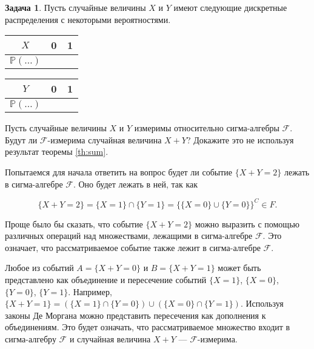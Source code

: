 \documentclass[pdftex, 12pt, a4paper]{article}
\def \mbb{\mathbb}
\def \PP{\mbb{P}}
\def\F{\ensuremath{\mathcal{F}}} %
\theoremstyle{definition} %
\newtheorem{problem}{Задача}
\numberwithin{problem}{section}
\numberwithin{blits}{section}
\begin{document}
\begin{problem}
Пусть случайные величины $X$ и $Y$ имеют следующие дискретные распределения с некоторыми вероятностями.

\begin{table}[H]
\centering
\setlength\tabcolsep{4pt}
\begin{minipage}{0.48\textwidth}
\centering
\begin{tabular}{|c|c|c|}
\hline
 $X$ & 0 & 1 \\
\hline
 $\PP(\ldots)$& $\mbox{ }$ & $\mbox{ }$ \\
\hline
\end{tabular}
\end{minipage}
\hfill
\begin{minipage}{0.48\textwidth}
\centering
\begin{tabular}{|c|c|c|}
\hline
 $Y$ & 0 & 1 \\
\hline
 $\PP(\ldots)$& $\mbox{ }$ & $\mbox{ }$ \\
\hline
\end{tabular}
\end{minipage}
\end{table}

Пусть случайные величины $X$ и $Y$ измеримы относительно сигма-алгебры $\F$. Будут ли $\F$-измерима  случайная величина $X+Y$? Докажите это не используя результат теоремы \ref{th:sum}.

\begin{sol}
Попытаемся для начала ответить на вопрос будет ли событие  $\{X+Y =2\}$ лежать в сигма-алгебре $\F$. Оно будет лежать в ней, так как 

\[ \{X+Y=2\} = \{X=1\} \cap \{Y=1\} = \{\{X=0\} \cup \{Y=0\}\}^C \in F. \]

Проще было бы сказать, что событие $\{X+Y=2\}$ можно выразить с помощью различных операций над множествами, лежащими в сигма-алгебре $\F$. Это означает, что рассматриваемое событие также лежит в сигма-алгебре $\F$. 

Любое из событий $A = \{X+Y=0\}$ и $B = \{X+Y = 1\}$ может быть представлено как объединение и пересечение событий $\{X=1\}$, $\{X=0\}$, $\{Y=0\}$, $\{Y=1\}$. Например, $\{X+Y=1\} = (\{X=1\} \cap \{Y=0\})\cup (\{X=0\} \cap \{Y=1\})$. Используя законы Де Моргана можно представить пересечения как дополнения к объединениям. Это будет означать, что рассматриваемое множество входит в сигма-алгебру $\F$ и случайная величина $X+Y$ --- \F-измерима.

\end{sol}
\end{problem}
\end{document}
